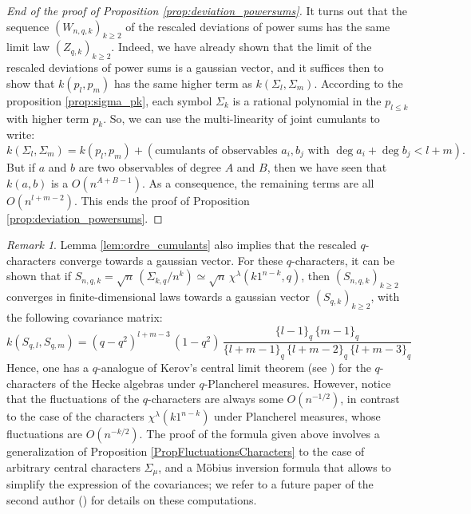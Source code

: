 \documentclass[10pt]{amsart}
\theoremstyle{remark}
\newtheorem{remark}{Remark}
\begin{document}
\begin{proof}[End of the proof of Proposition  \ref{prop:deviation_powersums}] It turns out that the sequence $(W_{n,q,k})_{k\geq 2}$ of the rescaled deviations of power sums has the same limit law $(Z_{q,k})_{k \geq 2}$. Indeed, we have already shown that the limit of the rescaled deviations of power sums is a gaussian vector, and it suffices then to show that $k(p_l,p_m)$ has the same higher term as $k(\varSigma_l,\varSigma_m)$. According to the proposition \ref{prop:sigma_pk}, each symbol $\varSigma_k$ is a rational polynomial in the $p_{l\leq k}$ with higher term $p_k$.  So, we can use the multi-linearity of joint cumulants to write:
$$k(\varSigma_l,\varSigma_m)=k(p_l,p_m) + (\text{cumulants of observables }a_i,b_j\text{ with }\deg a_i+\deg b_j <l+m).$$
But if $a$ and $b$ are two observables of degree $A$ and $B$, then we have seen that $k(a,b)$ is a $O(n^{A+B-1})$. As a consequence, the remaining terms are all $O(n^{l+m-2})$. This ends the proof of Proposition \ref{prop:deviation_powersums}.
\end{proof}\medskip


\begin{remark}\label{RemFluctuationsQCharacters}
Lemma \ref{lem:ordre_cumulants} also implies that the rescaled $q$-characters converge towards a gaussian vector. For these $q$-characters, it can be shown that if $S_{n,q,k}=\sqrt{n}\,(\varSigma_{k,q}/n^{k})\simeq \sqrt{n} \,\chi^{\lambda}(k1^{n-k},q)$, then $(S_{n,q,k})_{k \geq 2}$ converges in finite-dimensional laws towards a gaussian vector $(S_{q,k})_{k \geq 2}$, with the following covariance matrix:
$$k(S_{q,l},S_{q,m})=(q-q^{2})^{l+m-3}\,(1-q^{2})\,\frac{\{l-1\}_{q}\,\{m-1\}_{q}}{\{l+m-1\}_{q}\,\{l+m-2\}_{q}\,\{l+m-3\}_{q}}$$
Hence, one has a $q$-analogue of Kerov's central limit theorem (see \cite[Theorem 6.1]{IO02}) for the $q$-characters of the Hecke algebras under $q$-Plancherel measures. However, notice that the fluctuations of the $q$-characters are always some $O(n^{-1/2})$, in contrast to the case of the characters $\chi^{\lambda}(k1^{n-k})$ under Plancherel measures, whose fluctuations are $O(n^{-k/2})$. The proof of the formula given above involves a generalization of Proposition \ref{PropFluctuationsCharacters} to the case of arbitrary central characters $\varSigma_{\mu}$, and a M\"obius  inversion formula that allows to simplify the expression of the covariances; we refer to a future paper of the second author (\cite{Mel10}) for details on these computations.
\end{remark}\bigskip
\end{document}
